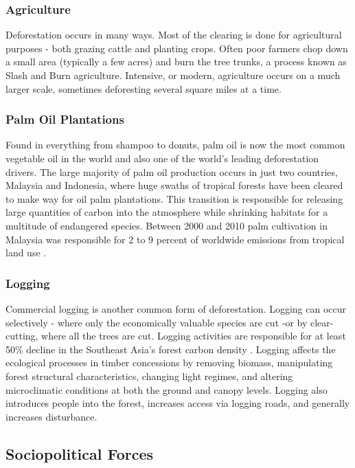 \subsubsection {Agriculture}

Deforestation occurs in many ways. Most of the clearing is done for agricultural purposes - both grazing cattle and planting crops. Often poor farmers chop down a small area (typically a few acres) and burn the tree trunks, a process known as Slash and Burn agriculture. Intensive, or modern, agriculture occurs on a much larger scale, sometimes deforesting several square miles at a time.

\subsubsection{Palm Oil Plantations}

Found in everything from shampoo to donuts, palm oil is now the most common vegetable oil in the world and also one of the world's leading deforestation drivers. The large majority of palm oil production occurs in just two countries, Malaysia and Indonesia, where huge swaths of tropical forests have been cleared to make way for oil palm plantations. This transition is responsible for releasing large quantities of carbon into the atmosphere while shrinking habitats for a multitude of endangered species. Between 2000 and 2010 palm cultivation in Malaysia was responsible for 2 to 9 percent of worldwide emissions from tropical land use \citep{carlson2013refined}. 

\subsubsection{Logging} 

Commercial logging is another common form of deforestation. Logging can occur selectively - where only the economically valuable species are cut  -or by clear-cutting, where all the trees are cut. Logging activities are responsible for at least 50\% decline in the Southeast Asia's forest carbon density \citep{hawthorne2011impact}. Logging affects the ecological processes in timber concessions by removing biomass, manipulating forest structural characteristics, changing light regimes, and altering microclimatic conditions at both the ground and canopy levels. Logging also introduces people into the forest, increases access via logging roads, and generally increases disturbance. 

\subsection{Sociopolitical Forces}

